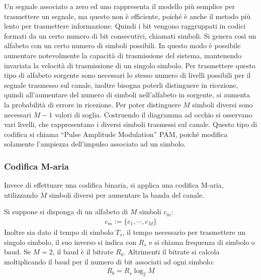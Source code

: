 \documentclass{article}
\numberwithin{equation}{subsection}
\begin{document}
Un segnale associato a zero ed uno rappresenta il modello più semplice per trasmettere un segnale, ma questo non è efficiente, poiché è anche il metodo più lento per 
trasmettere informazione. Quindi i bit vengono raggruppati in codici formati da un certo numero di bit consecutivi, chiamati simboli. Si genera così un alfabeto con un 
certo numero di simboli possibili. In questo modo è possibile aumentare notevolmente la 
capacità di trasmissione del sistema, mantenendo invariata la velocità di trasmissione di un singolo simbolo.  
Per trasmettere questo tipo di alfabeto sorgente sono necessari lo stesso numero di livelli possibili per il segnale trasmesso sul canale, inoltre bisogna poterli distinguere 
in ricezione, quindi all'aumentare del numero di simboli nell'alfabeto in sorgente, si aumenta la probabilità di errore in ricezione. Per poter distinguere $M$ 
simboli diversi sono necessari $M-1$ valori di soglia. Costruendo il diagramma ad occhio si osservano vari livelli, che rappresentano i diversi simboli trasmessi sul canale. Questo tipo di codifica si 
chiama ``Pulse Amplitude Modulation'' PAM, poiché modifica solamente l'ampiezza dell'impulso associato ad un simbolo. 

\subsubsection{Codifica M-aria}

Invece di effettuare una codifica binaria, si applica una codifica M-aria, utilizzando $M$ simboli diversi per aumentare la banda del canale. 

Si suppone si disponga di un alfabeto di $M$ simboli $c_m$:
\begin{gather*}
    c_m:=\biggl\{c_1,\cdots,c_M\biggr\}
\end{gather*}
Inoltre sia dato il tempo di simbolo $T_s$, il tempo necessario per trasmettere un singolo simbolo, il suo inverso si indica con $R_s$ e si chiama frequenza di simbolo o 
baud. Se $M=2$, il baud è il bitrate $R_b$. Altrimenti il bitrate si calcola moltiplicando il baud per il numero di bit associati ad ogni simbolo:
\begin{gather*}
    R_b=R_s\log_{2}M
\end{gather*}
\end{document}
